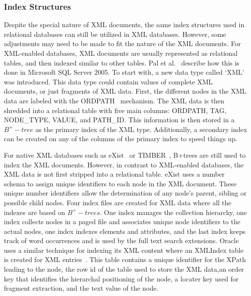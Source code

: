 \documentclass[12pt,a4paper]{article}
\begin{document}
\subsubsection{Index Structures}

Despite the special nature of XML documents, the same index structures used in relational databases can still be utilized in XML databases. However, some
adjustments may need to be made to fit the nature of the XML documents. For XML-enabled databases, XML documents are usually represented as relational tables,
and then indexed similar to other tables. Pal et al.~\cite{pal2004indexing} describe how this is done in Microsoft SQL Server 2005. To start with, a new data
type called `XML' was introduced. This data type could contain values of complete XML documents, or just fragments of XML data. First, the different nodes in
the XML data are labeled with the ORDPATH~\cite{o2004ordpaths} mechanism. The XML data is then shredded into a relational table with five main columns: ORDPATH,
TAG, NODE\_TYPE, VALUE, and PATH\_ID. This information is then stored in a $B^{+}-tree$ as the primary index of the XML type. Additionally, a secondary index
can be created on any of the columns of the primary index to speed things up.


For native XML databases such as eXist~\cite{meier2009exist} or TIMBER~\cite{jagadish2002timber}, B+trees are still used to index the XML documents.
However, in contrast to XML-enabled databases, the XML data is not first stripped into a relational table. eXist uses a number schema to assign unique
identifiers to each node in the XML document. These unique number identifiers allow the determination of any node's parent, sibling or possible child nodes.
Four index files are created for XML data where all the indexes are based on $B^{+}-trees$. One index manages the collection hierarchy, one index collects nodes
in a paged file and associates unique node identifiers to the actual nodes, one index indexes elements and attributes, and the last index keeps track of word
occurrences and is used by the full text search extensions. Oracle uses a similar technique for indexing its XML content where an XMLIndex table is created for
XML entries~\cite{oracleXML}. This table contains a unique identifier for the XPath leading to the node, the row id of the table used to store the XML data,an
order key that identifies the hierarchal positioning of the node, a locater key used for fragment extraction, and the text value of the node.
\end{document}
